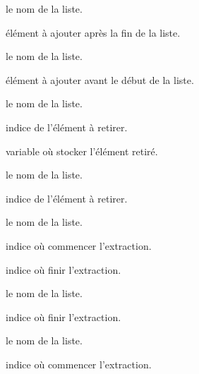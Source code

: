\documentclass[12pt,a4paper]{article}
\begin{document}
 le nom de la liste.

 élément à ajouter après la fin de la liste.




\separation





 le nom de la liste.

 élément à ajouter avant le début de la liste.




\separation




 le nom de la liste.

 indice de l'élément à retirer.




\separation



 variable où stocker l'élément retiré.

 le nom de la liste.

 indice de l'élément à retirer.




\separation



 le nom de la liste.

 indice où commencer l'extraction.

 indice où finir l'extraction.




\separation



 le nom de la liste.

 indice où finir l'extraction.




\separation



 le nom de la liste.

 indice où commencer l'extraction.
\end{document}
